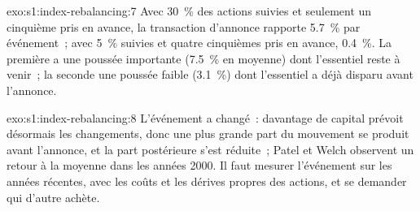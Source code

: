 \begin{solution}{exo:s1:index-rebalancing:7}
Avec 30~\% des actions suivies et seulement un cinquième pris en avance, la transaction d'annonce rapporte 5.7~\% par événement~; avec 5~\% suivies et quatre cinquièmes pris en avance, 0.4~\%.
La première a une poussée importante (7.5~\% en moyenne) dont l'essentiel reste à venir~; la seconde une poussée faible (3.1~\%) dont l'essentiel a déjà disparu avant l'annonce.
\end{solution}

\begin{solution}{exo:s1:index-rebalancing:8}
L'événement a changé~: davantage de capital prévoit désormais les changements, donc une plus grande part du mouvement se produit avant l'annonce, et la part postérieure s'est réduite~;
Patel et Welch observent un retour à la moyenne dans les années 2000. Il faut mesurer l'événement sur les années récentes, avec les coûts et les dérives propres des actions, et se demander qui d'autre achète.
\end{solution}


